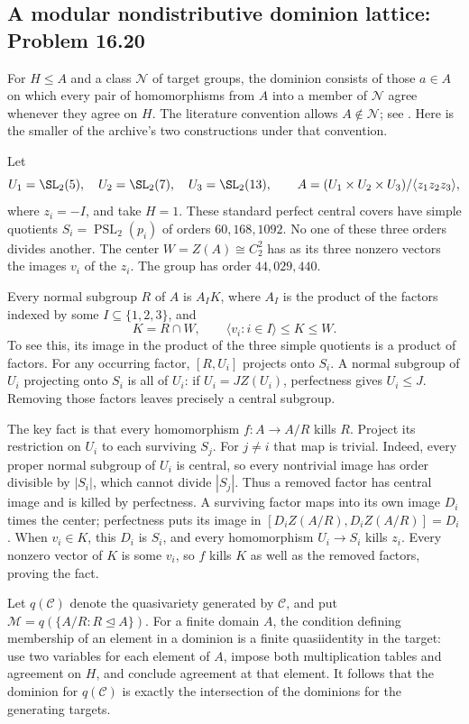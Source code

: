 \subsection{A modular nondistributive dominion lattice: Problem 16.20}
\label{cand:16.20}

For \(H\leq A\) and a class \(\mathcal N\) of target groups,
the dominion consists of those \(a\in A\) on which every pair
of homomorphisms from \(A\) into a member of \(\mathcal N\)
agree whenever they agree on \(H\). The literature convention
allows \(A\notin\mathcal N\); see
\cite{shakhova-dominions}. Here is the smaller of the archive's
two constructions under that convention.

Let
\[
 U_1=\SL_2(5),\quad U_2=\SL_2(7),\quad U_3=\SL_2(13),
 \qquad A=(U_1\times U_2\times U_3)/\langle z_1z_2z_3\rangle,
\]
where \(z_i=-I\), and take \(H=1\).
These standard perfect central covers have simple quotients
\(S_i=\operatorname{PSL}_2(p_i)\) of orders \(60,168,1092\).
No one of these three orders divides another. The center
\(W=Z(A)\cong C_2^2\) has as its three nonzero vectors the
images \(v_i\) of the \(z_i\). The group has order
\(44{,}029{,}440\).

Every normal subgroup \(R\) of \(A\) is \(A_I K\), where
\(A_I\) is the product of the factors indexed by some
\(I\subseteq\{1,2,3\}\), and
\[
 K=R\cap W,\qquad \langle v_i:i\in I\rangle\leq K\leq W.
\]
To see this, its image in the product of the three simple
quotients is a product of factors. For any occurring factor,
\([R,U_i]\) projects onto \(S_i\). A normal subgroup of
\(U_i\) projecting onto \(S_i\) is all of \(U_i\):
if \(U_i=JZ(U_i)\), perfectness gives \(U_i\leq J\).
Removing those factors leaves precisely a central subgroup.

The key fact is that every homomorphism \(f:A\to A/R\)
kills \(R\). Project its restriction on \(U_i\) to each
surviving \(S_j\). For \(j\ne i\) that map is trivial.
Indeed, every proper normal subgroup of \(U_i\) is central,
so every nontrivial image has order divisible by \(|S_i|\),
which cannot divide \(|S_j|\). Thus a removed factor has
central image and is killed by perfectness. A surviving
factor maps into its own image \(D_i\) times the center;
perfectness puts its image in
\([D_iZ(A/R),D_iZ(A/R)]=D_i\).
When \(v_i\in K\), this \(D_i\) is \(S_i\), and every
homomorphism \(U_i\to S_i\) kills \(z_i\). Every nonzero
vector of \(K\) is some \(v_i\), so \(f\) kills \(K\)
as well as the removed factors, proving the fact.

Let \(q(\mathcal C)\) denote the quasivariety generated by
\(\mathcal C\), and put
\(\mathcal M=q(\{A/R:R\trianglelefteq A\})\).
For a finite domain \(A\), the condition defining membership
of an element in a dominion is a finite quasiidentity in the
target: use two variables for each element of \(A\), impose
both multiplication tables and agreement on \(H\), and
conclude agreement at that element. It follows that the
dominion for \(q(\mathcal C)\) is exactly the intersection
of the dominions for the generating targets.

